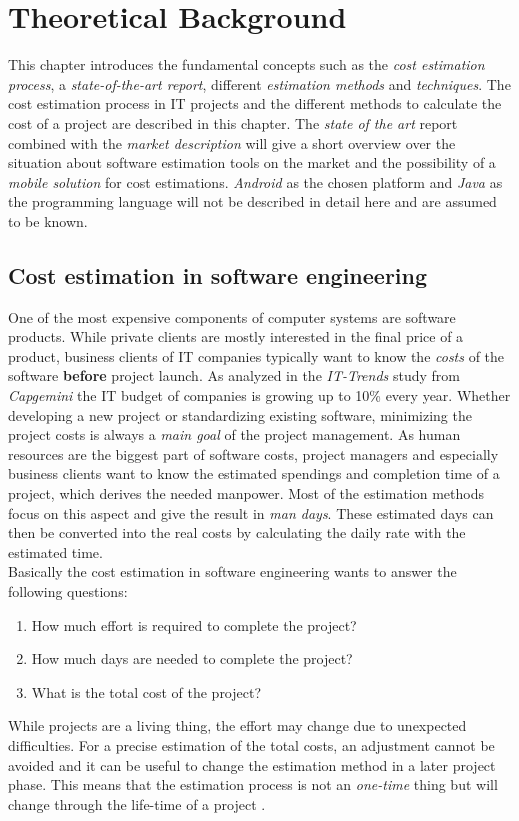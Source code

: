 \chapter{Theoretical Background}

This chapter introduces the fundamental concepts such as the \textit{cost estimation process}, a \textit{state-of-the-art report}, different \textit{estimation methods} and \textit{techniques}. The cost estimation process in IT projects and the different methods to calculate the cost of a project are described in this chapter. The \textit{state of the art} report combined with the \textit{market description} will give a short overview over the situation about software estimation tools on the market and the possibility of a \textit{mobile solution} for cost estimations. \textit{Android} as the chosen platform and \textit{Java} as the programming language will not be described in detail here and are assumed to be known.

\section{Cost estimation in software engineering}

One of the most expensive components of computer systems are software products. While private clients are mostly interested in the final price of a product, business clients of IT companies typically want to know the \textit{costs} of the software \textbf{before} project launch. As analyzed in the \textit{IT-Trends} study from \textit{Capgemini} \cite{capgemini} the IT budget of companies is growing up to 10\% every year. Whether developing a new project or standardizing existing software, minimizing the project costs is always a \textit{main goal} of the project management. As human resources are the biggest part of software costs, project managers and especially business clients want to know the estimated spendings and completion time of a project, which derives the needed manpower. Most of the estimation methods focus on this aspect and give the result in \textit{man days}. These estimated days can then be converted into the real costs by calculating the daily rate with the estimated time.
\\
Basically the cost estimation in software engineering wants to answer the following questions:
\begin{enumerate}
\item How much effort is required to complete the project?
\item How much days are needed to complete the project?
\item What is the total cost of the project?
\end{enumerate}
While projects are a living thing, the effort may change due to unexpected difficulties. For a precise estimation of the total costs, an adjustment cannot be avoided and it can be useful to change the estimation method in a later project phase. This means that the estimation process is not an \textit{one-time} thing but will change through the life-time of a project \cite{itplanung}. 


